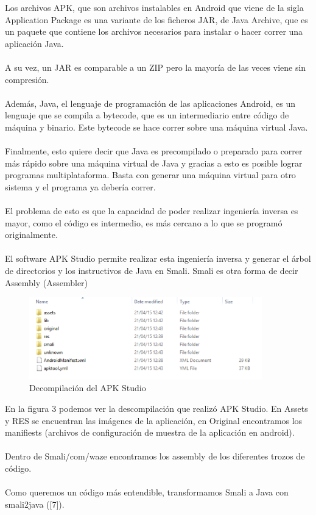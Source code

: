 Los archivos APK, que son archivos instalables en Android que viene de la sigla Application Package es una variante de los ficheros JAR, de Java Archive, que es un paquete que contiene los archivos necesarios para instalar o hacer correr una aplicación Java.
\\\\
A su vez, un JAR es comparable a un ZIP pero la mayoría de las veces viene sin compresión.
\\\\
    Además, Java, el lenguaje de programación de las aplicaciones Android, es un lenguaje que se compila a bytecode, que es un intermediario entre código de máquina y binario. Este bytecode se hace correr sobre una máquina virtual Java.
\\\\
Finalmente, esto quiere decir que Java es precompilado o preparado para correr más rápido sobre una máquina virtual de Java y gracias a esto es posible lograr programas multiplataforma. Basta con generar una máquina virtual para otro sistema y el programa ya debería correr.
\\\\
El problema de esto es que la capacidad de poder realizar ingeniería inversa es mayor, como el código es intermedio, es más cercano a lo que se programó originalmente.
\\\\
El software APK Studio permite realizar esta ingeniería inversa y generar el árbol de directorios y los instructivos de Java en Smali. Smali es otra forma de decir Assembly (Assembler)
    
        \begin{figure}[H]
  \begin{center}
    \includegraphics[width=0.9\textwidth]{imagenes/fig26.png}
    \caption{Decompilación del APK Studio}
  \end{center}
\end{figure}
    
En la figura 3 podemos ver la descompilación que realizó APK Studio. En Assets y RES se encuentran las imágenes de la aplicación, en Original encontramos los manifiests (archivos de configuración de muestra de la aplicación en android).
\\\\
Dentro de Smali/com/waze encontramos los assembly de los diferentes trozos de código.
\\\\
Como queremos un código más entendible, transformamos Smali a Java con smali2java ([7]).


